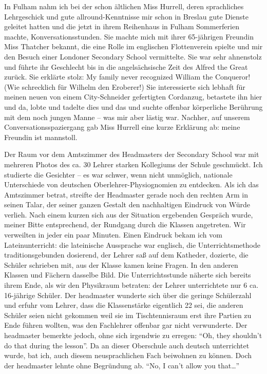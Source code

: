 In Fulham nahm ich bei der schon ältlichen Miss Hurrell, deren sprachliches Lehrgeschick und gute allround-Kenntnisse mir schon in Breslau gute Dienste geleitet hatten und die jetzt in ihrem Reihenhaus in Fulham Sommerferien machte, Konversationsstunden. Sie machte mich mit ihrer 65-jährigen Freundin Miss Thatcher bekannt, die eine Rolle im englischen Flottenverein spielte und mir den Besuch einer Londoner Secondary School vermittelte. Sie war sehr ahnenstolz und führte ihr Geschlecht bis in die angelsächsische Zeit des Alfred the Great zurück. Sie erklärte stolz: My family never recognized William the Conqueror! (Wie schrecklich für Wilhelm den Eroberer!) Sie interessierte sich lebhaft für meinen neuen von einem City-Schneider gefertigten Cordanzug, betastete ihn hier und da, lobte und tadelte dies und das und suchte offenbar körperliche Berührung mit dem noch jungen Manne -- was mir aber lästig war. Nachher, auf unserem Conversationsspaziergang gab Miss Hurrell eine kurze Erklärung ab: meine Freundin ist manns\-toll.

Der Raum vor dem Amtszimmer des Headmasters der Secondary School war mit mehreren Photos des ca. 30 Lehrer starken Kollegiums der Schule geschmückt. Ich studierte die Gesichter -- es war schwer, wenn nicht unmöglich, nationale Unterschiede von deutschen Oberlehrer-Physiognomien zu entdecken. Als ich das Amtszimmer betrat, streifte der Headmaster gerade noch den rechten Arm in seinen Talar, der seiner ganzen Gestalt den nachhaltigen Eindruck von Würde verlieh. Nach  einem kurzen sich aus der Situation ergebenden Gespräch wurde, meiner Bitte entsprechend, der Rundgang durch die Klassen angetreten. Wir verweilten in jeder ein paar Minuten. Einen Eindruck bekam ich vom Lateinunterricht: die lateinische Aussprache war englisch, die Unterrichtsmethode traditionsgebunden dosierend, der Lehrer saß auf dem Katheder, dozierte, die Schüler schrieben mit, aus der Klasse kamen keine Fragen. In den anderen Klassen und Fächern dasselbe Bild. Die Unterrichtsstunde näherte sich bereits ihrem Ende, als wir den Physikraum betraten: der Lehrer unterrichtete nur 6 ca. 16-jährige Schüler. Der headmaster wunderte sich über die geringe Schülerzahl und erfuhr vom Lehrer, dass die Klassenstärke eigentlich 22 sei, die anderen Schüler seien nicht gekommen weil sie im Tischtennisraum erst ihre Partien zu Ende führen wollten, was den Fachlehrer offenbar gar nicht verwunderte. Der headmaster bemerkte jedoch, ohne sich irgendwie zu erregen: \enquote{Oh, they shouldn't do that during the lesson}. Da an dieser Oberschule auch deutsch unterrichtet wurde, bat ich, auch diesem neusprachlichen Fach beiwohnen zu können. Doch der headmaster lehnte ohne Begründung ab. \enquote{No, I can't allow you that\dots}

